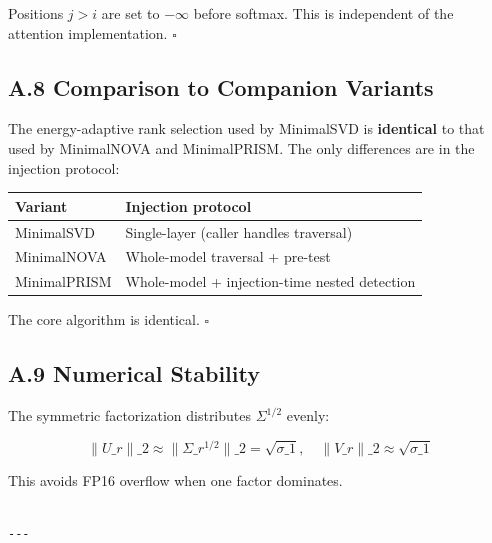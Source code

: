 Positions $j > i$ are set to $-\infty$ before softmax. This is independent 
of the attention implementation. $\square$

\subsection{A.8 Comparison to Companion Variants}

The energy-adaptive rank selection used by MinimalSVD is \textbf{identical} to 
that used by MinimalNOVA and MinimalPRISM. The only differences are in the 
injection protocol:

\begin{table}[H]
\centering
\small
\begin{tabular}{ll}
\toprule
\textbf{Variant} & \textbf{Injection protocol} \\
\midrule
MinimalSVD & Single-layer (caller handles traversal) \\
MinimalNOVA & Whole-model traversal + pre-test \\
MinimalPRISM & Whole-model + injection-time nested detection \\
\bottomrule
\end{tabular}
\end{table}

The core algorithm is identical. $\square$

\subsection{A.9 Numerical Stability}

The symmetric factorization distributes $\Sigma^{1/2}$ evenly:

\[
\|U\_r\|\_2 \approx \|\Sigma\_r^{1/2}\|\_2 = \sqrt{\sigma\_1}, \quad
\|V\_r\|\_2 \approx \sqrt{\sigma\_1}
\tag{A.5}
\]

This avoids FP16 overflow when one factor dominates.
\begin{lstlisting}

---
\end{lstlisting}